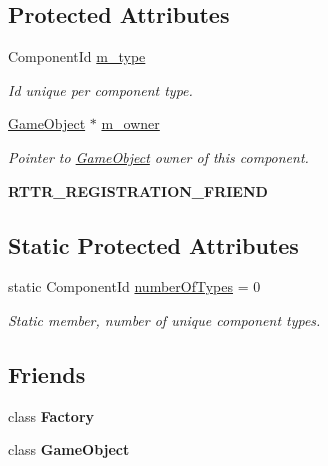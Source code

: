 \subsection*{Protected Attributes}
\begin{DoxyCompactItemize}
\item 
\mbox{\label{classBaseComponent_ae4de98b70923b6c515ced3a97b2f3d32}} 
Component\+Id \hyperlink{classBaseComponent_ae4de98b70923b6c515ced3a97b2f3d32}{m\+\_\+type}
\begin{DoxyCompactList}\small\item\em Id unique per component type. \end{DoxyCompactList}\item 
\mbox{\label{classBaseComponent_a0b7f35e80a5033c8ba721f40927e6e75}} 
\hyperlink{classGameObject}{Game\+Object} $\ast$ \hyperlink{classBaseComponent_a0b7f35e80a5033c8ba721f40927e6e75}{m\+\_\+owner}
\begin{DoxyCompactList}\small\item\em Pointer to \hyperlink{classGameObject}{Game\+Object} owner of this component. \end{DoxyCompactList}\item 
\mbox{\label{classBaseComponent_a0d398cc5055095b7b8aa5a0f6f054ad1}} 
{\bfseries R\+T\+T\+R\+\_\+\+R\+E\+G\+I\+S\+T\+R\+A\+T\+I\+O\+N\+\_\+\+F\+R\+I\+E\+ND}
\end{DoxyCompactItemize}
\subsection*{Static Protected Attributes}
\begin{DoxyCompactItemize}
\item 
\mbox{\label{classBaseComponent_a084ade347bc71a7f0d3b17ecdc2225a4}} 
static Component\+Id \hyperlink{classBaseComponent_a084ade347bc71a7f0d3b17ecdc2225a4}{number\+Of\+Types} = 0
\begin{DoxyCompactList}\small\item\em Static member, number of unique component types. \end{DoxyCompactList}\end{DoxyCompactItemize}
\subsection*{Friends}
\begin{DoxyCompactItemize}
\item 
\mbox{\label{classBaseComponent_a328c093d609680cca505905c6d49901a}} 
class {\bfseries Factory}
\item 
\mbox{\label{classBaseComponent_a00df87c957d8f7ee0fc51f07a0542f4a}} 
class {\bfseries Game\+Object}
\end{DoxyCompactItemize}


